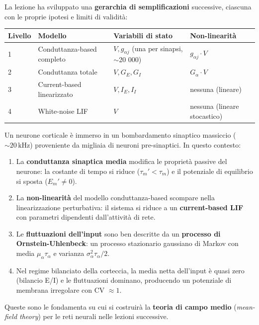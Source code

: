 La lezione ha sviluppato una \textbf{gerarchia di semplificazioni} successive, ciascuna con le proprie ipotesi e limiti di validità:

\begin{table}[htbp]
    \centering
    \renewcommand{\arraystretch}{1.3}
    \begin{tabularx}{\textwidth}{|l|l|X|X|}
    \hline
    \textbf{Livello} & \textbf{Modello} & \textbf{Variabili di stato} & \textbf{Non-linearità} \\
    \hline
    1 & Conduttanza-based completo & $V, g_{\alpha j}$ (una per sinapsi, $\sim$20 000) & $g_{\alpha j} \cdot V$ \\
    \hline
    2 & Conduttanza totale & $V, G_E, G_I$ & $G_\alpha \cdot V$ \\
    \hline
    3 & Current-based linearizzato & $V, I_E, I_I$ & nessuna (lineare) \\
    \hline
    4 & White-noise LIF & $V$ & nessuna (lineare stocastico) \\
    \hline
    \end{tabularx}
\end{table}

Un neurone corticale è immerso in un bombardamento sinaptico massiccio ($\sim 20\,\text{kHz}$) proveniente da migliaia di neuroni pre-sinaptici. In questo contesto:

\begin{enumerate}
    \item La \textbf{conduttanza sinaptica media} modifica le proprietà passive del neurone: la costante di tempo si riduce ($\tau_m' < \tau_m$) e il potenziale di equilibrio si sposta ($E_m' \neq 0$).
    \item La \textbf{non-linearità} del modello conduttanza-based scompare nella linearizzazione perturbativa: il sistema si riduce a un \textbf{current-based LIF} con parametri dipendenti dall'attività di rete.
    \item Le \textbf{fluttuazioni dell'input} sono ben descritte da un \textbf{processo di Ornstein-Uhlenbeck}: un processo stazionario gaussiano di Markov con media $\mu_\alpha \tau_\alpha$ e varianza $\sigma_\alpha^2 \tau_\alpha/2$.
    \item Nel regime bilanciato della corteccia, la media netta dell'input è quasi zero (bilancio E/I) e le fluttuazioni dominano, producendo un potenziale di membrana irregolare con CV $\approx 1$.
\end{enumerate}

Queste sono le fondamenta su cui si costruirà la \textbf{teoria di campo medio} (\textit{mean-field theory}) per le reti neurali nelle lezioni successive.
